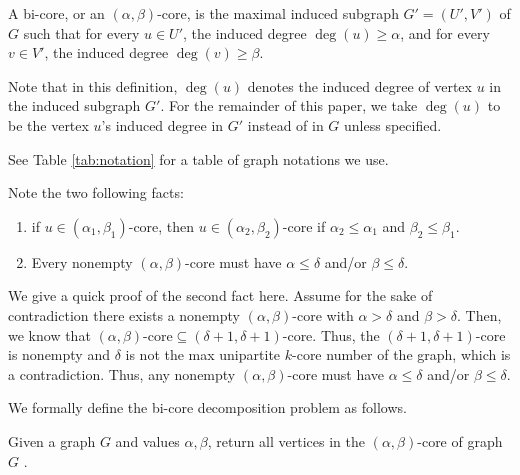 \begin{definition}\label{def:core}
A bi-core, or an $(\alpha,\beta)$-core,
is the maximal induced subgraph $G' = (U', V')$ of $G$ such that for every $u\in U'$, the induced degree $\deg(u)\ge \alpha$, and for every $v\in V'$, the induced degree $\deg(v)\ge \beta$. 
\end{definition}

Note that in this definition, $\deg(u)$ denotes the induced degree of vertex $u$ in the induced subgraph $G'$. For the remainder of this paper, we take $\deg(u)$ to be the vertex $u$'s induced degree in $G'$ instead of in $G$ unless specified.

See Table \ref{tab:notation} for a table of graph notations we use.

Note the two following facts:
\begin{enumerate}
    \item if $u\in (\alpha_1,\beta_1)$-core, then $u\in (\alpha_2,\beta_2)$-core if $\alpha_2\le \alpha_1$ and $\beta_2\le \beta_1$. 
    \item Every nonempty $(\alpha,\beta)$-core must have $\alpha\le\delta$ and/or $\beta\le\delta$.
\end{enumerate}

We give a quick proof of the second fact here. Assume for the sake of contradiction there exists a nonempty $(\alpha,\beta)$-core with $\alpha>\delta$ and $\beta>\delta$. Then, we know that $(\alpha,\beta)\text{-core} \subseteq (\delta+1,\delta+1)\text{-core}$. Thus, the $(\delta+1,\delta+1)$-core is nonempty and $\delta$ is not the max unipartite $k$-core number of the graph, which is a contradiction. Thus, any nonempty $(\alpha,\beta)$-core must have $\alpha\le\delta$ and/or $\beta\le\delta$.

We formally define the  bi-core decomposition problem as follows.

\begin{definition}\label{def:problem}
Given a graph $G$ and values $\alpha, \beta$, return all vertices in the $(\alpha,\beta)$-core of graph $G$ \cite{Liu2020Efficient}. 
\end{definition}

